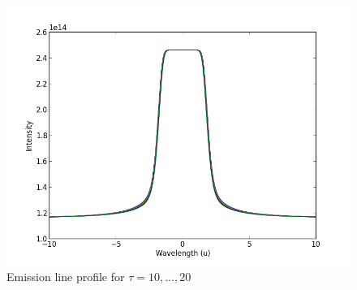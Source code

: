 \documentclass[norsk,a4paper,12pt]{article}
\begin{document}
\begin{figure}[H] 
\begin{center} 
\includegraphics[scale=0.5]{ssa35_2.png} 
 

\caption{Emission line profile for $\tau = 10, ..., 20$ } 
\end{center} 
\end{figure}
\end{document}
